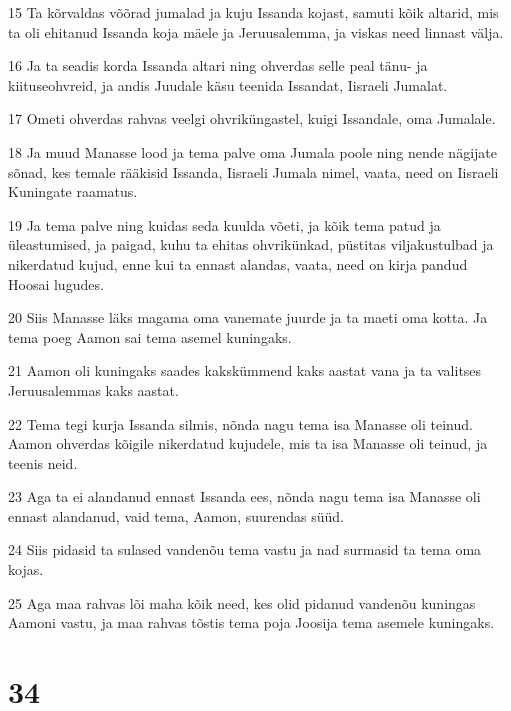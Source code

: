 \par 15 Ta kõrvaldas võõrad jumalad ja kuju Issanda kojast, samuti kõik altarid, mis ta oli ehitanud Issanda koja mäele ja Jeruusalemma, ja viskas need linnast välja.
\par 16 Ja ta seadis korda Issanda altari ning ohverdas selle peal tänu- ja kiituseohvreid, ja andis Juudale käsu teenida Issandat, Iisraeli Jumalat.
\par 17 Ometi ohverdas rahvas veelgi ohvriküngastel, kuigi Issandale, oma Jumalale.
\par 18 Ja muud Manasse lood ja tema palve oma Jumala poole ning nende nägijate sõnad, kes temale rääkisid Issanda, Iisraeli Jumala nimel, vaata, need on Iisraeli Kuningate raamatus.
\par 19 Ja tema palve ning kuidas seda kuulda võeti, ja kõik tema patud ja üleastumised, ja paigad, kuhu ta ehitas ohvrikünkad, püstitas viljakustulbad ja nikerdatud kujud, enne kui ta ennast alandas, vaata, need on kirja pandud Hoosai lugudes.
\par 20 Siis Manasse läks magama oma vanemate juurde ja ta maeti oma kotta. Ja tema poeg Aamon sai tema asemel kuningaks.
\par 21 Aamon oli kuningaks saades kakskümmend kaks aastat vana ja ta valitses Jeruusalemmas kaks aastat.
\par 22 Tema tegi kurja Issanda silmis, nõnda nagu tema isa Manasse oli teinud. Aamon ohverdas kõigile nikerdatud kujudele, mis ta isa Manasse oli teinud, ja teenis neid.
\par 23 Aga ta ei alandanud ennast Issanda ees, nõnda nagu tema isa Manasse oli ennast alandanud, vaid tema, Aamon, suurendas süüd.
\par 24 Siis pidasid ta sulased vandenõu tema vastu ja nad surmasid ta tema oma kojas.
\par 25 Aga maa rahvas lõi maha kõik need, kes olid pidanud vandenõu kuningas Aamoni vastu, ja maa rahvas tõstis tema poja Joosija tema asemele kuningaks.

\chapter{34}

